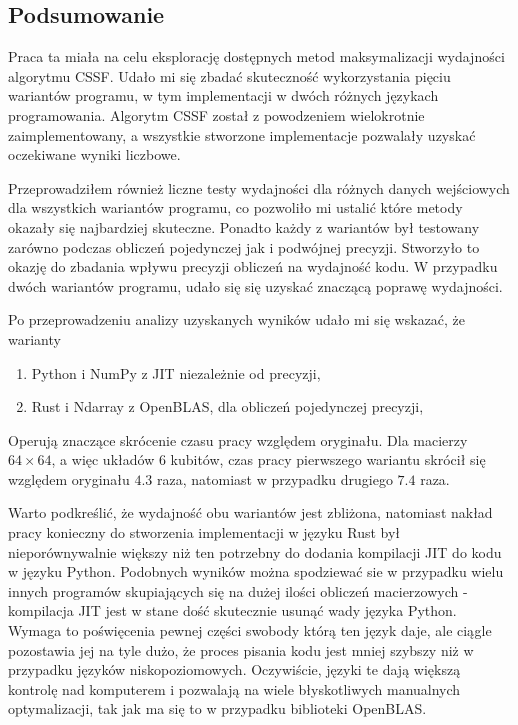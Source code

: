 \documentclass[11pt, a4paper]{article}
\begin{document}
\begin{sloppypar}
    \subsection{Podsumowanie}
    Praca ta miała na celu eksplorację dostępnych metod maksymalizacji wydajności
    algorytmu CSSF. Udało mi się zbadać skuteczność wykorzystania pięciu wariantów programu,
    w tym implementacji w dwóch różnych językach programowania. Algorytm CSSF został z powodzeniem
    wielokrotnie zaimplementowany, a wszystkie stworzone implementacje pozwalały uzyskać
    oczekiwane wyniki liczbowe.

    Przeprowadziłem również liczne testy wydajności dla różnych danych wejściowych dla
    wszystkich wariantów programu, co pozwoliło mi ustalić które metody okazały się najbardziej
    skuteczne. Ponadto każdy z wariantów był testowany zarówno podczas obliczeń
    pojedynczej jak i podwójnej precyzji. Stworzyło to okazję do zbadania wpływu precyzji
    obliczeń na wydajność kodu. W przypadku dwóch wariantów programu, udało się się uzyskać
    znaczącą poprawę wydajności.

    Po przeprowadzeniu analizy uzyskanych wyników udało mi się wskazać, że warianty
    \begin{enumerate}
      \item Python i NumPy z JIT niezależnie od precyzji,

      \item Rust i Ndarray z OpenBLAS, dla obliczeń pojedynczej precyzji,
    \end{enumerate}

    Operują znaczące skrócenie czasu pracy względem oryginału. Dla macierzy $64\times64$,
    a więc układów 6 kubitów, czas pracy pierwszego wariantu skrócił się względem
    oryginału $4.3$ raza, natomiast w przypadku drugiego $7.4$ raza.

    Warto podkreślić, że wydajność obu wariantów jest zbliżona, natomiast nakład pracy konieczny
    do stworzenia implementacji w języku Rust był nieporównywalnie większy niż ten potrzebny
    do dodania kompilacji JIT do kodu w języku Python. Podobnych wyników można
    spodziewać sie w przypadku wielu innych programów skupiających się na dużej ilości
    obliczeń macierzowych - kompilacja JIT jest w stane dość skutecznie usunąć wady
    języka Python. Wymaga to poświęcenia pewnej części swobody którą ten język daje, ale
    ciągle pozostawia jej na tyle dużo, że proces pisania kodu jest mniej szybszy niż w przypadku
    języków niskopoziomowych. Oczywiście, języki te dają większą kontrolę nad komputerem
    i pozwalają na wiele błyskotliwych manualnych optymalizacji, tak jak ma się to w
    przypadku biblioteki OpenBLAS.


\end{sloppypar}
\end{document}
